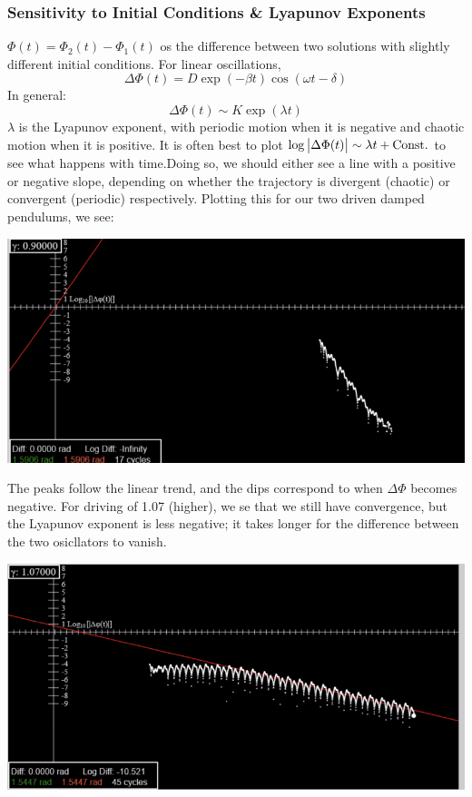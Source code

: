 \subsubsection{Sensitivity to Initial Conditions \& Lyapunov Exponents}
$\Phi(t) = \Phi_2(t) - \Phi_1(t)$ os the difference between two solutions with slightly different initial conditions. For linear oscillations,
\[\Delta \Phi(t) = D\exp(-\beta t)\cos(\omega t - \delta)\]
In general:
\[\Delta \Phi(t) \sim K\exp(\lambda t)\]
$\lambda$ is the Lyapunov exponent, with periodic motion when it is negative and chaotic motion when it is positive. It is often best to plot $\log\abs{\Delta \Phi(t)} \sim \lambda t + \text{Const.}$ to see what happens with time.Doing so, we should either see a line with a positive or negative slope, depending on whether the trajectory is divergent (chaotic) or convergent (periodic) respectively. Plotting this for our two driven damped pendulums, we see:
\begin{center}
    \includegraphics[scale=0.7]{Lecture-33/l33-img5.png}
\end{center}
The peaks follow the linear trend, and the dips correspond to when $\Delta \Phi$ becomes negative. For driving of 1.07 (higher), we se that we still have convergence, but the Lyapunov exponent is less negative; it takes longer for the difference between the two osicllators to vanish.
\begin{center}
    \includegraphics[scale=0.7]{Lecture-33/l33-img6.png}
\end{center}

